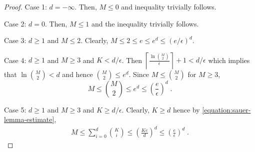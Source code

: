 \begin{proof}
Case 1: $d = -\infty$. Then, $M \le 0$ and inequality trivially follows.

Case 2: $d = 0$. Then, $M \le 1$ and the inequality trivially follows.

Case 3: $d \ge 1$ and $M \le 2$. Clearly, $M \le 2 \le e \le e^d \le (e/\epsilon)^d$.

Case 4: $d \ge 1$ and $M \ge 3$ and $K < d/\epsilon$. Then
$\left\lceil \frac{\ln \binom{M}{2}}{\epsilon} \right\rceil + 1 < d/\epsilon$
which implies that $\ln \binom{M}{2} < d$ and hence $\binom{M}{2} \le e^d$.
Since $M \le \binom{M}{2}$ for $M \ge 3$,
$$
M \le \binom{M}{2} \le e^d \le \left( \frac{e}{\epsilon} \right)^d \; .
$$

Case 5: $d \ge 1$ and $M \ge 3$ and $K \ge d/\epsilon$. Clearly, $K \ge d$ hence by \eqref{equation:sauer-lemma-estimate},
\begin{align*}
M
\le \sum_{i=0}^d \binom{K}{i}
\le \left( \frac{Ke}{d} \right)^d
\le \left( \frac{e}{\epsilon} \right)^d \; .
\end{align*}
\end{proof}
